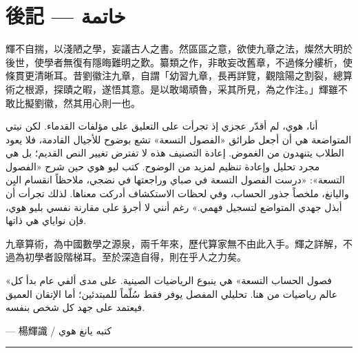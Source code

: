 \documentclass[11pt,a4paper]{article}
\newcommand{\ar}[1]{\arabicfont\beginR #1\endR}
\newcommand{\longline}{\noindent\rule{\textwidth}{0.4pt}}
\newcommand{\ChinCol}[1]{\begin{minipage}[t]{0.48\textwidth}#1\end{minipage}}
\newcommand{\ArabCol}[1]{\begin{minipage}[t]{0.48\textwidth}\arabicfont\beginR #1\endR\end{minipage}}
\newcommand{\parallelsection}[2]{%
  \noindent\ChinCol{#1}\hfill\ArabCol{#2}\par\vspace{0.5cm}%
}
\begin{document}
\newpage


\section*{後記 --- \ar{خاتمة}}

\parallelsection{%
輝不自揣，以淺陋之學，妄議古人之書。然區區之意，欲使九章之法，燦然大明於後世，使學者無復有隱晦難明之歎。纂類之作，非敢妄改舊章，不過條分縷析，使條貫更清晰耳。昔劉徽注九章，自謂「幼習九章，長再詳覽，觀陰陽之割裂，總算術之根源，探賾之暇，遂悟其意。是以敢竭頑魯，采其所見，為之作注。」輝雖不敢比擬劉徽，然其用心則一也。
}{%
أنا، هوي، لم أقدّر عجزي إذ تجرأت على التعليق على مؤلفات القدماء. لكن نيتي المتواضعة هي أن أجعل طرائق «الفصول التسعة» تشع بوضوح للأجيال القادمة، فلا يعود الطلاب يتنهدون من الغموض. إعادة التصنيف هذه لا تفترض تغيير النص القديم؛ بل هي مجرد تحليل وإعادة تنظيم لمزيد من الوضوح. كتب ليو هوي حين شرح «الفصول التسعة»: «درست الفصول التسعة في صباي وراجعتها في نضجي، ملاحظاً انقسام اليِن واليانغ، ملخصاً جذور الحساب، وفي لحظات الاستكشاف أدركت معناها. لذلك تجرأت أن أبذل جهدي المتواضع لتسجيل فهمي.» رغم أنني لا أجرؤ على مقارنة نفسي بليو هوي، فإن نواياي هي ذاتها.
}

\parallelsection{%
九章算術，為中國數學之源泉，兩千年來，歷代算家無不由此入手。輝之詳解，不過為初學者設階梯耳。至於深造自得，則在乎人之力矣。
}{%
«فصول الحساب التسعة» هي ينبوع الرياضيات الصينية. على مدى ألفي عام بدأ كل عالم رياضيات من هنا. تحليلي المفصل يوفر فقط سُلّماً للمبتدئين؛ أما الإتقان العميق فيعتمد على جهد كل شخص بنفسه.
}

\begin{flushright}
--- 楊輝識 / \ar{كتبه يانغ هوي}
\end{flushright}

\medskip
\longline

\vspace{0.5cm}
\end{document}
